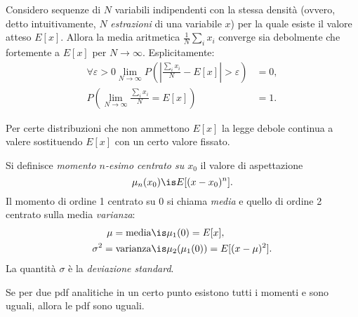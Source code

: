 \begin{fact}
	\label{th:grossnum}
	Considero sequenze di $N$ variabili indipendenti con la stessa densità (ovvero, detto intuitivamente, $N$ \emph{estrazioni} di una variabile $x$) per la quale esiste il valore atteso $E[x]$.
	Allora la media aritmetica $\frac1N\sum_ix_i$ converge sia debolmente che fortemente a $E[x]$ per $N\to\infty$.
	Esplicitamente:
	\begin{align*}
		\forall\varepsilon > 0 \lim_{N\to \infty} P\left( \left| \frac{\sum_ix_i}N - E[x] \right| > \varepsilon \right) &= 0, \\
		P\left( \lim_{N\to \infty} \frac{\sum_ix_i}N = E[x] \right) &= 1.
	\end{align*}
\end{fact}

\noindent Per certe distribuzioni che non ammettono $E[x]$ la legge debole continua a valere sostituendo $E[x]$ con un certo valore fissato.

\begin{definition}[Momenti]
	Si definisce \emph{momento $n$-esimo centrato su $x_0$} il valore di aspettazione
	\begin{equation*}
		\mu_n(x_0) \is E[(x - x_0)^n].
	\end{equation*}
	Il momento di ordine 1 centrato su 0 si chiama \emph{media} e quello di ordine 2 centrato sulla media \emph{varianza}:
	\begin{align*}
		\mu = \text{media} &\is \mu_1(0) = E[x], \\
		\sigma^2 = \text{varianza} &\is \mu_2(\mu_1(0)) = E[(x-\mu)^2].
	\end{align*}
	La quantità $\sigma$ è la \emph{deviazione standard}.
\end{definition}

\begin{fact}
	\label{th:pdfmom}
	Se per due pdf analitiche in un certo punto esistono tutti i momenti e sono uguali, allora le pdf sono uguali.
\end{fact}
